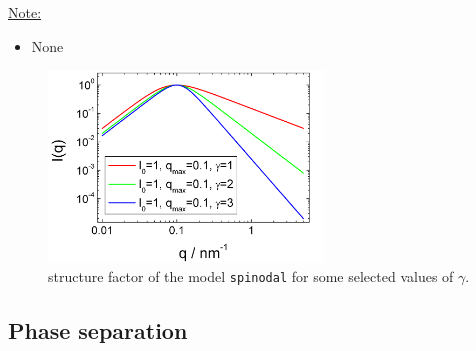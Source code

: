 \underline{Note:}
\begin{itemize}
\item None
\end{itemize}



\begin{figure}[htb]
\begin{center}
\end{center}
\includegraphics[width=0.65\textwidth]{spinodalIQ.png}
\caption{structure factor of the model \texttt{spinodal} for some selected values of $\gamma$.} \label{fig:phaseseparationIQ}
\end{figure}

\clearpage
\subsection{Phase separation}
\label{sect:phase separation}
~\\

